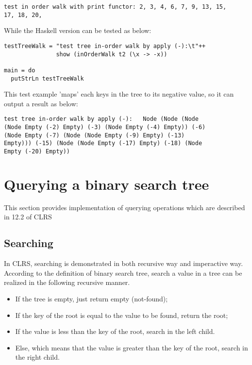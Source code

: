 \documentclass{article}
\begin{document}
\begin{verbatim}
test in order walk with print functor: 2, 3, 4, 6, 7, 9, 13, 15, 
17, 18, 20,
\end{verbatim}

While the Haskell version can be tested as below:

\lstset{language=Haskell}
\begin{lstlisting}
testTreeWalk = "test tree in-order walk by apply (-):\t"++
               show (inOrderWalk t2 (\x -> -x))

main = do
  putStrLn testTreeWalk
\end{lstlisting}

This test example 'maps' each keys in the tree to its negative value,
so it can output a result as below:

\begin{verbatim}
test tree in-order walk by apply (-):   Node (Node (Node 
(Node Empty (-2) Empty) (-3) (Node Empty (-4) Empty)) (-6) 
(Node Empty (-7) (Node (Node Empty (-9) Empty) (-13) 
Empty))) (-15) (Node (Node Empty (-17) Empty) (-18) (Node 
Empty (-20) Empty))
\end{verbatim}

\section{Querying a binary search tree}

This section provides implementation of querying operations which are
described in 12.2 of CLRS\cite{CLRS}

\subsection{Searching}
In CLRS\cite{CLRS}, searching is demonstrated in both recursive way and 
imperactive way. According to the definition of binary search tree, search
a value in a tree can be realized in the following recursive manner.

\begin{itemize}
\item If the tree is empty, just return empty (not-found);
\item If the key of the root is equal to the value to be found, 
return the root;
\item If the value is less than the key of the root, search in the left
child.
\item Else, which means that the value is greater than the key of the 
root, search in the right child.
\end{itemize}
\end{document}
